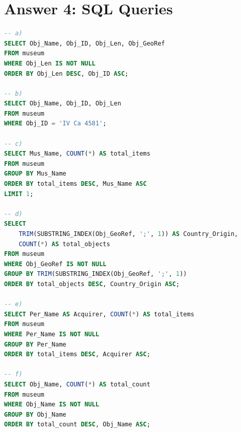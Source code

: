 \documentclass[12pt,a4paper]{report}
\begin{document}
\chapter*{Answer 4: SQL Queries}
\begin{lstlisting}[language=SQL]
-- a)
SELECT Obj_Name, Obj_ID, Obj_Len, Obj_GeoRef
FROM museum
WHERE Obj_Len IS NOT NULL
ORDER BY Obj_Len DESC, Obj_ID ASC;

-- b)
SELECT Obj_Name, Obj_ID, Obj_Len
FROM museum
WHERE Obj_ID = 'IV Ca 4581';

-- c)
SELECT Mus_Name, COUNT(*) AS total_items
FROM museum
GROUP BY Mus_Name
ORDER BY total_items DESC, Mus_Name ASC
LIMIT 1;

-- d)
SELECT
    TRIM(SUBSTRING_INDEX(Obj_GeoRef, ';', 1)) AS Country_Origin,
    COUNT(*) AS total_objects
FROM museum
WHERE Obj_GeoRef IS NOT NULL
GROUP BY TRIM(SUBSTRING_INDEX(Obj_GeoRef, ';', 1))
ORDER BY total_objects DESC, Country_Origin ASC;

-- e)
SELECT Per_Name AS Acquirer, COUNT(*) AS total_items
FROM museum
WHERE Per_Name IS NOT NULL
GROUP BY Per_Name
ORDER BY total_items DESC, Acquirer ASC;

-- f)
SELECT Obj_Name, COUNT(*) AS total_count
FROM museum
WHERE Obj_Name IS NOT NULL
GROUP BY Obj_Name
ORDER BY total_count DESC, Obj_Name ASC;
\end{lstlisting}
\end{document}
